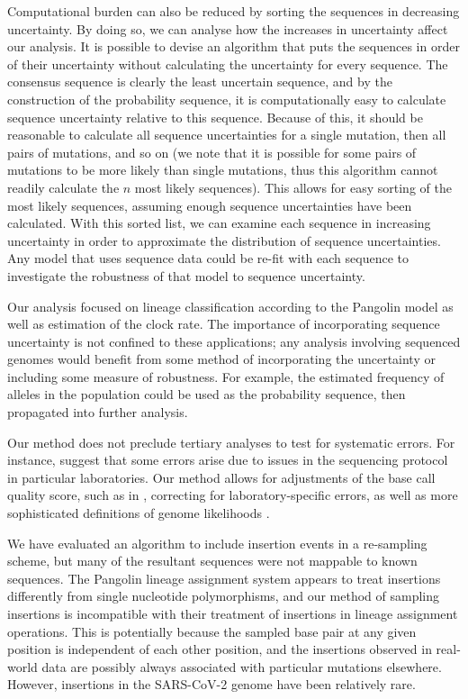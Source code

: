 \documentclass[10pt]{article}
\begin{document}
Computational burden can also be reduced by sorting the sequences in decreasing uncertainty.
By doing so, we can analyse how the increases in uncertainty affect our analysis.
It is possible to devise an algorithm that puts the sequences in order of their uncertainty without calculating the uncertainty for every sequence.
The consensus sequence is clearly the least uncertain sequence, and by the construction of the probability sequence, it is computationally easy to calculate sequence uncertainty relative to this sequence.
Because of this, it should be reasonable to calculate all sequence uncertainties for a single mutation, then all pairs of mutations, and so on (we note that it is possible for some pairs of mutations to be more likely than single mutations, thus this algorithm cannot readily calculate the $n$ most likely sequences).
This allows for easy sorting of the most likely sequences, assuming enough sequence uncertainties have been calculated.
With this sorted list, we can examine each sequence in increasing uncertainty in order to approximate the distribution of sequence uncertainties.
Any model that uses sequence data could be re-fit with each sequence to investigate the robustness of that model to sequence uncertainty.

Our analysis focused on lineage classification according to the Pangolin model as well as estimation of the clock rate.
The importance of incorporating sequence uncertainty is not confined to these applications; any analysis involving sequenced genomes would benefit from some method of incorporating the uncertainty or including some measure of robustness.
For example, the estimated frequency of alleles in the population could be used as the probability sequence, then propagated into further analysis.

Our method does not preclude tertiary analyses to test for systematic errors.
For instance, \citet{demaioIssuesSARSCoV2Sequencing2020} suggest that some errors arise due to issues in the sequencing protocol in particular laboratories.
Our method allows for adjustments of the base call quality score, such as in \citet{brockmanQualityScoresSNP2008}, correcting for laboratory-specific errors, as well as more sophisticated definitions of genome likelihoods \citep[\eg ][]{liAdjustQualityScores2004, depristoFrameworkVariationDiscovery2011, liSNPDetectionMassively2009}.

We have evaluated an algorithm to include insertion events in a re-sampling scheme, but many of the resultant sequences were not mappable to known sequences.
The Pangolin lineage assignment system appears to treat insertions differently from single nucleotide polymorphisms, and our method of sampling insertions is incompatible with their treatment of insertions in lineage assignment operations.
This is potentially because the sampled base pair at any given position is independent of each other position, and the insertions observed in real-world data are possibly always associated with particular mutations elsewhere.
However, insertions in the SARS-CoV-2 genome have been relatively rare.
\end{document}
